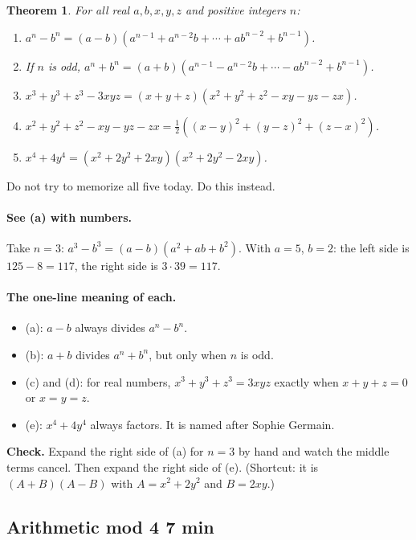 \documentclass[11pt]{article}
\theoremstyle{plain}
\newtheorem{theorem}{Theorem}
\theoremstyle{definition}
\begin{document}
\begin{theorem}
For all real $a, b, x, y, z$ and positive integers $n$:
\begin{enumerate}
  \item[(a)] $a^n - b^n = (a-b)\left(a^{n-1} + a^{n-2}b + \cdots + ab^{n-2} + b^{n-1}\right)$.
  \item[(b)] If $n$ is \emph{odd}, $a^n + b^n = (a+b)\left(a^{n-1} - a^{n-2}b + \cdots - ab^{n-2} + b^{n-1}\right)$.
  \item[(c)] $x^3 + y^3 + z^3 - 3xyz = (x+y+z)\left(x^2 + y^2 + z^2 - xy - yz - zx\right)$.
  \item[(d)] $x^2 + y^2 + z^2 - xy - yz - zx = \tfrac{1}{2}\left((x-y)^2 + (y-z)^2 + (z-x)^2\right)$.
  \item[(e)] $x^4 + 4y^4 = \left(x^2 + 2y^2 + 2xy\right)\left(x^2 + 2y^2 - 2xy\right)$.
\end{enumerate}
\end{theorem}

Do not try to memorize all five today. Do this instead.

\paragraph{See (a) with numbers.} Take $n = 3$: $a^3 - b^3 = (a-b)(a^2 + ab + b^2)$. With $a = 5$, $b = 2$: the left side is $125 - 8 = 117$, the right side is $3 \cdot 39 = 117$.

\paragraph{The one-line meaning of each.}
\begin{itemize}
  \item (a): $a - b$ always divides $a^n - b^n$.
  \item (b): $a + b$ divides $a^n + b^n$, but only when $n$ is odd.
  \item (c) and (d): for real numbers, $x^3 + y^3 + z^3 = 3xyz$ exactly when $x + y + z = 0$ or $x = y = z$.
  \item (e): $x^4 + 4y^4$ always factors. It is named after Sophie Germain.
\end{itemize}

\noindent\textbf{Check.} Expand the right side of (a) for $n = 3$ by hand and watch the middle terms cancel. Then expand the right side of (e). (Shortcut: it is $(A + B)(A - B)$ with $A = x^2 + 2y^2$ and $B = 2xy$.)

\subsection{Arithmetic mod 4 \hfill 7 min}
\end{document}
